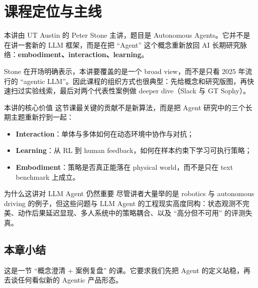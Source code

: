 \section{课程定位与主线}

本讲由 UT Austin 的 Peter Stone 主讲，题目是 Autonomous Agents。它并不是在讲一套新的 LLM 框架，而是在把 ``Agent'' 这个概念重新放回 AI 长期研究脉络：\textbf{embodiment、interaction、learning}。

Stone 在开场明确表示，本讲要覆盖的是一个 broad view，而不是只看 2025 年流行的 ``agentic LLM''。因此课程的组织方式也很典型：先给概念和研究版图，再快速扫过实验线索，最后对两个代表性案例做 deeper dive（Slack 与 GT Sophy）。

\begin{importantbox}{本讲的核心价值}
这节课最关键的贡献不是新算法，而是把 Agent 研究中的三个长期主题重新拧到一起：
\begin{itemize}
    \item \textbf{Interaction}：单体与多体如何在动态环境中协作与对抗；
    \item \textbf{Learning}：从 RL 到 human feedback，如何在样本约束下学习可执行策略；
    \item \textbf{Embodiment}：策略是否真正能落在 physical world，而不是只在 text benchmark 上成立。
\end{itemize}
\end{importantbox}

\begin{knowledgebox}{为什么这讲对 LLM Agent 仍然重要}
尽管讲者大量举的是 robotics 与 autonomous driving 的例子，但这些问题与 LLM Agent 的工程现实高度同构：状态观测不完美、动作后果延迟显现、多人系统中的策略耦合、以及 ``高分但不可用'' 的评测失真。
\end{knowledgebox}

\subsection{本章小结}
这是一节 ``概念澄清 + 案例复盘'' 的课。它要求我们先把 Agent 的定义站稳，再去谈任何看似新的 Agentic 产品形态。

